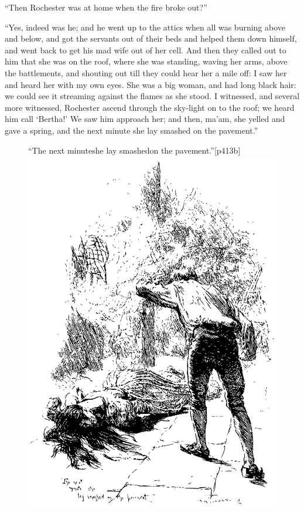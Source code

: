 \enquote{Then \Mr{} Rochester was at home when the fire broke out?}

\enquote{Yes, indeed was he; and he went up to the attics when all was
burning above and below, and got the servants out of their beds and
helped them down himself, and went back to get his mad wife out of her
cell. And then they called out to him that she was on the roof, where
she was standing, waving her arms, above the battlements, and shouting
out till they could hear her a mile off: I saw her and heard her with my
own eyes. She was a big woman, and had long black hair: we could see it
streaming against the flames as she stood. I witnessed, and several
more witnessed, \Mr{} Rochester ascend through the sky-light on to the
roof; we heard him call \enquote{Bertha!} We saw him approach her; and
then, ma'am, she yelled and gave a spring, and the next minute she lay
smashed on the pavement.}

\begin{figure}
	\begin{sidecaption}{\enquote{The next minute\linebreak she lay smashed\linebreak on the pavement.}}[p413b]
		\centering
		\includegraphics[width=\linewidth]{images/p413b.pdf}
	\end{sidecaption}
\end{figure}

